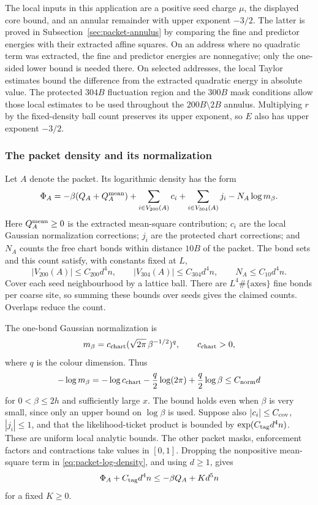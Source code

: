 The local inputs in this application are a positive seed charge
$\mu$, the displayed core bound, and an annular remainder with upper
exponent $-3/2$. The latter is proved in
Subsection~\ref{sec:packet-annulus} by comparing the fine and predictor
energies with their extracted affine squares. On an address where no quadratic term
was extracted, the fine and predictor energies are nonnegative;
only the one-sided lower bound is needed there. On selected addresses,
the local Taylor estimates bound the difference from the extracted
quadratic energy in absolute value. The protected $304B$ fluctuation
region and the $300B$ mask conditions allow those local estimates to
be used throughout the $200B\setminus2B$ annulus. Multiplying $r$ by the
fixed-density ball count preserves its upper exponent, so $E$ also
has upper exponent $-3/2$.

\subsubsection{The packet density and its normalization}
Let $A$ denote the packet. Its logarithmic density has the form
\begin{equation}\label{eq:packet-log-density}
 \Phi_A=-\beta(Q_A+Q_A^{\rm mean})
       +\sum_{i\in V_{200}(A)}c_i
       +\sum_{i\in V_{304}(A)}j_i
       -N_A\log m_\beta.
\end{equation}
Here $Q_A^{\rm mean}\ge0$ is the extracted mean-square contribution;
$c_i$ are the local Gaussian normalization corrections; $j_i$ are the
protected chart corrections; and $N_A$ counts the free chart bonds
within distance $10B$ of the packet. The bond sets and this count
satisfy, with constants fixed at $L$,
\[
 |V_{200}(A)|\le C_{200}d^4n,\qquad
 |V_{304}(A)|\le C_{304}d^4n,\qquad
 N_A\le C_{10}d^4n.
\]
Cover each seed neighbourhood by a lattice ball. There are
$L^4\#\{\text{axes}\}$ fine bonds per coarse site, so summing these
bounds over seeds gives the claimed counts. Overlaps reduce the count.

The one-bond Gaussian normalization is
\[
 m_\beta=c_{\rm chart}(\sqrt{2\pi}\,\beta^{-1/2})^q,
 \qquad c_{\rm chart}>0,
\]
where $q$ is the colour dimension. Thus
\[
 -\log m_\beta
 =-\log c_{\rm chart}-\frac q2\log(2\pi)
                        +\frac q2\log\beta
 \le C_{\rm norm}d
\]
for $0<\beta\le2h$ and sufficiently large $x$. The bound holds even
when $\beta$ is very small, since only an upper bound on $\log\beta$
is used. Suppose also $|c_i|\le C_{\rm cov}$, $|j_i|\le1$, and that
the likelihood-ticket product is bounded by
$\exp(C_{\rm tag}d^4n)$. These are uniform local analytic bounds.
The other packet masks, enforcement factors and contractions take
values in $[0,1]$. Dropping the nonpositive mean-square term in
\eqref{eq:packet-log-density}, and using $d\ge1$, gives
\begin{equation}\label{eq:packet-normalization}
 \Phi_A+C_{\rm tag}d^4n
 \le-\beta Q_A+K d^5 n
\end{equation}
for a fixed $K\ge0$.

